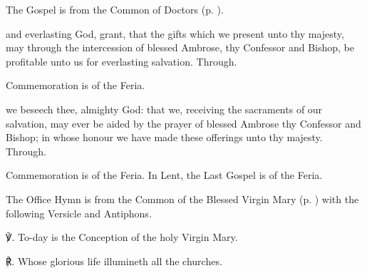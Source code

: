\begin{rubric}
	The Gospel is from the Common of Doctors (p. \pageref{CommonDoctors}).
\end{rubric}


\secret
{} and everlasting God, grant, that the gifts which we present unto thy majesty, may through the intercession of blessed Ambrose, thy Confessor and Bishop, be profitable unto us for everlasting salvation. Through.

\begin{rubric}
	Commemoration is of the Feria.
\end{rubric}


\postcommunion
{} we beseech thee, almighty God: that we, receiving the sacraments of our salvation, may ever be aided by the prayer of blessed Ambrose thy Confessor and Bishop; in whose honour we have made these offerings unto thy majesty. Through.

\begin{rubric}
	Commemoration is of the Feria. In Lent, the Last Gospel is of the Feria.
\end{rubric}


\vspace{3ex}


\begin{rubric}
	The Office Hymn is from the Common of the Blessed Virgin Mary (p. \pageref{CommonBVM}) with the following Versicle and Antiphons.
\end{rubric}
℣. To-day is the Conception of the holy Virgin Mary.

℟. Whose glorious life illumineth all the churches.


